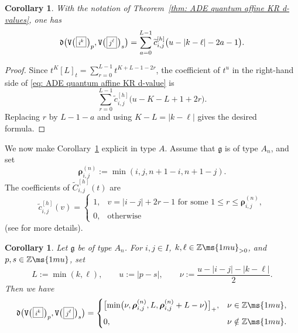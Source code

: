 \documentclass[12pt, leqno]{amsart}
\numberwithin{equation}{section}
\theoremstyle{plain}
\newtheorem{corollary}[lemma]{Corollary}
\theoremstyle{definition}
\newcommand{\Vkm}[1]{%
  \ttV\bigl(\hspace{0.2ex}\scalebox{.8}{\(\boxed{#1}\)}\hspace{0.2ex}\bigr)%
}
\newcommand{\seteq}{\mathbin{:=}}
\newcommand{\g}{\mathfrak{g}}
\newcommand{\Z}{\mathbb{Z}\ms{1mu}}
\newcommand{\de}{\mathfrak{d}}
\newcommand{\tC}{\widetilde{C}}
\newcommand{\tc}{\widetilde{c}}
\newcommand{\brho}{{\boldsymbol{\rho}}}
\newcommand{\ttV}{\mathtt{V}}
\begin{document}
\begin{corollary}\label{cor: ADE KR d-value coefficient sum}
With the notation of
Theorem~\ref{thm: ADE quantum affine KR d-values}, one has
\begin{equation}\label{eq: ADE KR d-value coefficient sum}
\de\bigl(\Vkm{i^k}_p,\Vkm{j^\ell}_s\bigr)
= \sum_{a=0}^{L-1} \tc_{i,j}^{[h]} \bigl( u-|k-\ell|-2a-1 \bigr). 
\end{equation}
\end{corollary}

\begin{proof}
Since
$t^K[L]_t = \displaystyle\sum_{r=0}^{L-1}t^{K+L-1-2r}$,
the coefficient of \(t^u\) in the right-hand side of
\eqref{eq: ADE quantum affine KR d-value} is
\[
\sum_{r=0}^{L-1} \tc_{i,j}^{[h]} \bigl( u-K-L+1+2r \bigr). 
\]
Replacing \(r\) by \(L-1-a\) and using $K-L=|k-\ell|$
gives the desired formula.
\end{proof}

We now make
Corollary~\ref{cor: ADE KR d-value coefficient sum} explicit in
type \(A\).  Assume that \(\g\) is of type \(A_n\), and set
\[
\brho^{(n)}_{i,j} \seteq \min(i,j,n+1-i,n+1-j).
\]
The coefficients of \(\tC_{i,j}^{[h]}(t)\) are 
\begin{equation}\label{eq: type A inverse t-Cartan coefficients}
\tc_{i,j}^{[h]}(v)= 
\begin{cases}
1, & v=|i-j|+2r-1 \text{ for some } 1\leq r\leq\brho^{(n)}_{i,j}, \\
0,&\text{otherwise}
\end{cases}
\end{equation}
(see \cite[Theorem~4.12(1)]{KO23} for more details).

\begin{corollary}\label{cor: type A closed d-value formula}
Let \(\g\) be of type \(A_n\).  For
\(i,j\in I\), \(k,\ell\in\Z_{>0}\), and \(p,s\in\Z\), set
\[
L\seteq\min(k,\ell), \qquad u\seteq|p-s|, \qquad \nu \seteq \frac{u-|i-j|-|k-\ell|}{2}. 
\]
Then we have
\begin{equation}\label{eq: type A closed d-value formula}
\de\bigl( \Vkm{i^k}_p, \Vkm{j^\ell}_s \bigr)
=
\begin{cases}
\displaystyle  \bigl [ \min\bigl( \nu,\brho^{(n)}_{i,j},L,\brho^{(n)}_{i,j}+L-\nu \bigr) \bigr]_+, &\nu\in\Z, \\[2mm]
0,&\nu\notin\Z. 
\end{cases}
\end{equation}
\end{corollary}
\end{document}
